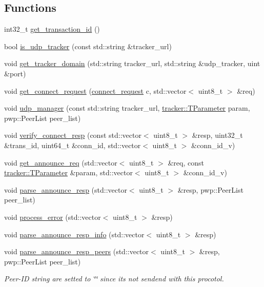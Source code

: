 \subsection*{Functions}
\begin{DoxyCompactItemize}
\item 
int32\+\_\+t \hyperlink{namespacet__udp_a8ff6ed3deaee00a35cc7afd4b37456d6}{get\+\_\+transaction\+\_\+id} ()
\item 
bool \hyperlink{namespacet__udp_af6fbd38370a6f5f7d8520144de7104c4}{is\+\_\+udp\+\_\+tracker} (const std\+::string \&tracker\+\_\+url)
\item 
void \hyperlink{namespacet__udp_a0e87c0151a7bceaace19434206566199}{get\+\_\+tracker\+\_\+domain} (std\+::string tracker\+\_\+url, std\+::string \&udp\+\_\+tracker, uint \&port)
\item 
void \hyperlink{namespacet__udp_adb2cdd5090cae67a7de482be4e281f23}{get\+\_\+connect\+\_\+request} (\hyperlink{structt__udp_1_1connect__request}{connect\+\_\+request} c, std\+::vector$<$ uint8\+\_\+t $>$ \&req)
\item 
void \hyperlink{namespacet__udp_af26a254f05566a7066b6930ad998a656}{udp\+\_\+manager} (const std\+::string tracker\+\_\+url, \hyperlink{structtracker_1_1TParameter}{tracker\+::\+T\+Parameter} param, pwp\+::\+Peer\+List peer\+\_\+list)
\item 
void \hyperlink{namespacet__udp_af6b2788d8ce8ab98f367838a7e3b7b09}{verify\+\_\+connect\+\_\+resp} (const std\+::vector$<$ uint8\+\_\+t $>$ \&resp, uint32\+\_\+t \&trans\+\_\+id, uint64\+\_\+t \&conn\+\_\+id, std\+::vector$<$ uint8\+\_\+t $>$ \&conn\+\_\+id\+\_\+v)
\item 
void \hyperlink{namespacet__udp_a5e968355a7c45dae0749b80e1be8308a}{get\+\_\+announce\+\_\+req} (std\+::vector$<$ uint8\+\_\+t $>$ \&req, const \hyperlink{structtracker_1_1TParameter}{tracker\+::\+T\+Parameter} \&param, std\+::vector$<$ uint8\+\_\+t $>$ \&conn\+\_\+id\+\_\+v)
\item 
void \hyperlink{namespacet__udp_a1f2a0ab9801cbc55002e67c166895a0e}{parse\+\_\+announce\+\_\+resp} (std\+::vector$<$ uint8\+\_\+t $>$ \&resp, pwp\+::\+Peer\+List peer\+\_\+list)
\item 
void \hyperlink{namespacet__udp_aab582ebbfac6fd929e811527e44384c1}{process\+\_\+error} (std\+::vector$<$ uint8\+\_\+t $>$ \&resp)
\item 
void \hyperlink{namespacet__udp_a42ced8af1acd3fb2bc46358effe48dbc}{parse\+\_\+announce\+\_\+resp\+\_\+info} (std\+::vector$<$ uint8\+\_\+t $>$ \&resp)
\item 
void \hyperlink{namespacet__udp_a8aa6906fdd81689928634df34688fed1}{parse\+\_\+announce\+\_\+resp\+\_\+peers} (std\+::vector$<$ uint8\+\_\+t $>$ \&resp, pwp\+::\+Peer\+List peer\+\_\+list)
\begin{DoxyCompactList}\small\item\em Peer-\/\+ID string are setted to \char`\"{}\char`\"{} since it\textquotesingle{}s not sendend with this procotol. \end{DoxyCompactList}\end{DoxyCompactItemize}


